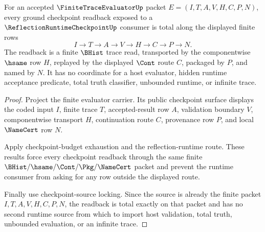 \begin{theorem}
\label{thm:finite-trace-evaluator-ground-checkpoint-readback-totality}
For an accepted $\FiniteTraceEvaluatorUp$ packet
$E=(I,T,A,V,H,C,P,N)$, every ground checkpoint readback exposed to a
$\ReflectionRuntimeCheckpointUp$ consumer is total along the displayed finite
rows
$$
I \to T \to A \to V \to H \to C \to P \to N.
$$
The readback is a finite $\BHist$ trace read, transported by the componentwise
$\hsame$ row $H$, replayed by the displayed $\Cont$ route $C$, packaged by
$P$, and named by $N$. It has no coordinate for a host evaluator, hidden
runtime acceptance predicate, total truth classifier, unbounded runtime, or
infinite trace.
\end{theorem}
\begin{proof}
Project the finite evaluator carrier. Its public checkpoint surface displays
the coded input $I$, finite trace $T$, accepted-result row $A$, validation
boundary $V$, componentwise transport $H$, continuation route $C$, provenance
row $P$, and local $\NameCert$ row $N$.

Apply checkpoint-budget exhaustion and the reflection-runtime route. These
results force every checkpoint readback through the same finite
$\BHist/\hsame/\Cont/\Pkg/\NameCert$ packet and prevent the runtime consumer
from asking for any row outside the displayed route.

Finally use checkpoint-source locking. Since the source is already the finite
packet $I,T,A,V,H,C,P,N$, the readback is total exactly on that packet and has
no second runtime source from which to import host validation, total truth,
unbounded evaluation, or an infinite trace.
\end{proof}

